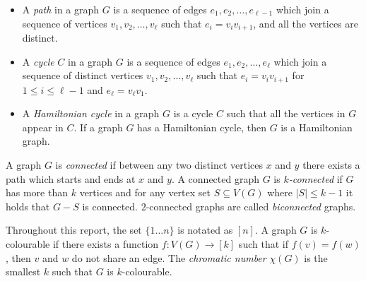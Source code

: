 \begin{itemize}
	\item A \textit{path} in a graph \(G\) is a sequence of edges \(e_1, e_2, \ldots, e_{\ell- 1}\) which join a sequence of vertices \(v_1, v_2, \ldots, v_{\ell}\) such that \(e_i = v_i v_{i + 1}\), and all the vertices are distinct.
	\item A \textit{cycle} \(C\) in a graph \(G\) is a sequence of edges \(e_1, e_2, \ldots, e_{\ell}\) which join a sequence of distinct vertices \(v_1, v_2, \ldots, v_{\ell}\) such that \(e_i = v_i v_{i + 1}\) for \(1 \leq i \leq \ell - 1\) and \(e_\ell = v_\ell v_1\).
	\item A \textit{Hamiltonian cycle} in a graph \(G\) is a cycle \(C\) such that all the vertices in \(G\) appear in \(C\). If a graph $G$ has a Hamiltonian cycle, then $G$ is a Hamiltonian graph. 
\end{itemize}

A graph $G$ is \textit{connected} if between any two distinct vertices $x$ and $y$ there exists a path which starts and ends at $x$ and $y$. 
A connected graph \(G\) is \textit{\(k\)-connected} if \(G\) has more than \(k\) vertices and for any vertex set $S \subseteq V(G)$ where $|S| \leq k - 1$ it holds that $G - S$ is connected. $2$-connected graphs are called \textit{biconnected} graphs. 

Throughout this report, the set $\lbrace 1\ldots n \rbrace$ is notated as $[n]$. 
A graph \(G\) is \(k\)-colourable if there exists a function \(f: V(G) \rightarrow [k]\) such that if $f(v) = f(w)$, then $v$ and $w$ do not share an edge. The \textit{chromatic number} \(\chi(G)\) is the smallest \(k\) such that \(G\) is \(k\)-colourable.


